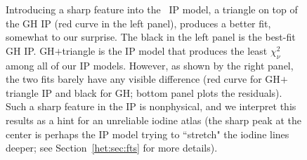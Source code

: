 \begin{figure}
\centering
{}
\caption{Introducing a sharp feature into the \het\ IP model, a
  triangle on top of the GH IP (red curve in the left panel), produces
  a better fit, somewhat to our surprise. The black in the left panel
  is the best-fit GH IP. GH$+$triangle is the IP model that produces
  the least $\chi^2_\nu$ among all of our IP models. However, as shown
  by the right panel, the two fits barely have any visible difference
  (red curve for GH$+$triangle IP and black for GH; bottom panel plots
  the residuals). Such a sharp feature in the IP is nonphysical, and we
  interpret this results as a hint for an unreliable iodine atlas
  (the sharp peak at the center is perhaps the IP model trying to
  ``stretch" the iodine lines deeper; see Section~\ref{het:sec:fts}
  for more details).
\label{het:fig:iodipcomp}}
\end{figure}


